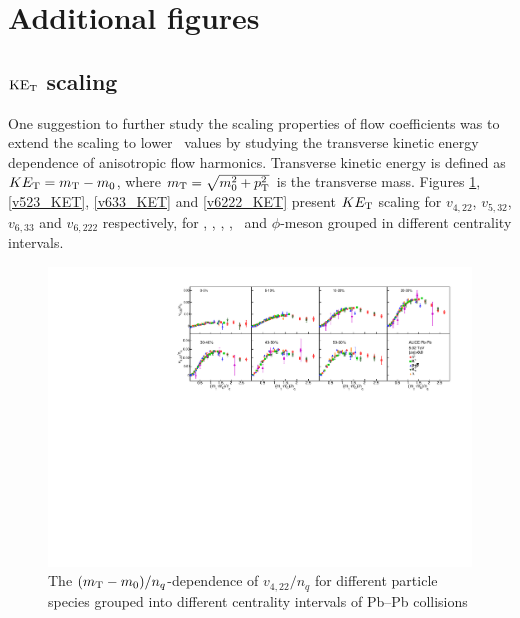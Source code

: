 \section{Additional figures}

\subsection{$\rm{KE_{T}}$ scaling}
\label{Subsubsection:KETscaling}

One suggestion to further study the scaling properties of flow coefficients was to extend the scaling to lower \pT~values by studying the transverse kinetic energy dependence of anisotropic flow harmonics. Transverse kinetic energy is defined as $KE_{\rm{T}} = m_{\rm{T}} - m_{\rm{0}}$, where $m_{\rm{T}}= \sqrt{m_{0}^2 + p_{\rm{T}}^2}$ is the transverse mass. Figures \ref{v422_KET}, \ref{v523_KET}, \ref{v633_KET} and \ref{v6222_KET} present $KE_{\rm{T}}$ scaling for $v_{4,22}$, $v_{5,32}$, $v_{6,33}$ and $v_{6,222}$ respectively, for \pion, \kaon, \proton, \Ks, \lambdas~and $\phi$-meson grouped in different centrality intervals.

\begin{figure}[htb]
\begin{center}
\includegraphics[scale=0.82]{figures/scaling/All_v422_gap00_KET.pdf}
\end{center}
\caption{The $(m_{\rm{T}} - m_{0})/n_{q}$-dependence of $v_{4,22}/n_{q}$ for different particle species grouped into different centrality intervals of Pb--Pb collisions \sNN}
\label{v422_KET}
\end{figure}

